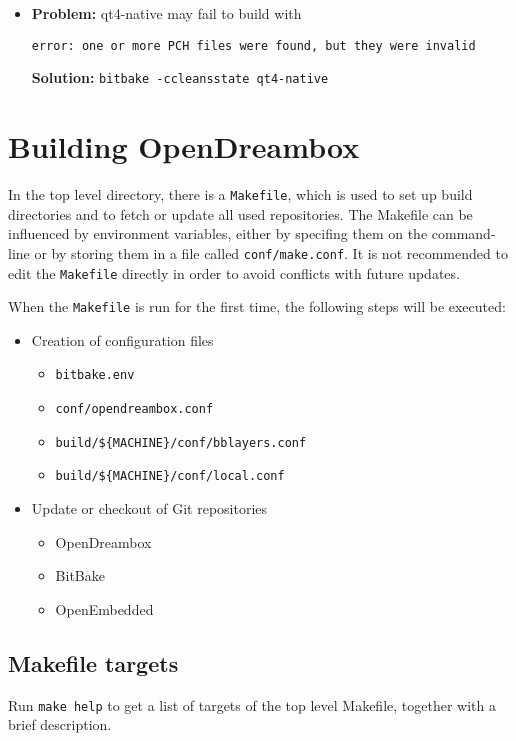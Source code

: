 \documentclass[a4paper]{article}
\newcommand{\shell}[1]{\texttt{\small #1}}
\begin{document}
  \begin{itemize}
    \item \textbf{Problem:} qt4-native may fail to build with

          \shell{error: one or more PCH files were found, but they were invalid}

    \textbf{Solution:} \shell{bitbake -ccleansstate qt4-native}
  \end{itemize}

\pagebreak

\section{Building OpenDreambox}

  In the top level directory, there is a \shell{Makefile}, which is used to
  set up build directories and to fetch or update all used repositories.
  The Makefile can be influenced by environment variables, either
  by specifing them on the command-line or by storing them in a file called
  \shell{conf/make.conf}. It is not recommended to edit the \shell{Makefile} directly
  in order to avoid conflicts with future updates.

  When the \shell{Makefile} is run for the first time, the following steps will
  be executed:

  \begin{itemize}
    \item Creation of configuration files
      \begin{itemize}
        \item \shell{bitbake.env}
        \item \shell{conf/opendreambox.conf}
        \item \shell{build/\$\{MACHINE\}/conf/bblayers.conf}
        \item \shell{build/\$\{MACHINE\}/conf/local.conf}
      \end{itemize}
    \item Update or checkout of Git repositories
      \begin{itemize}
        \item OpenDreambox
        \item BitBake
        \item OpenEmbedded
      \end{itemize}
  \end{itemize}

  \subsection{Makefile targets}
    Run \shell{make help} to get a list of targets of the top level Makefile, together with a brief description.
\end{document}
